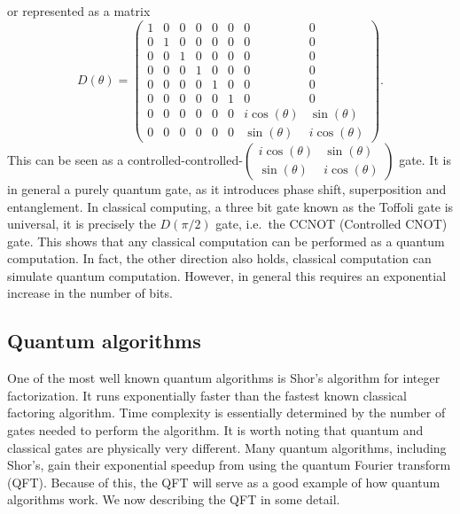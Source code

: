 \documentclass[a4paper,10pt,oneside]{book}
\theoremstyle{plain}
\theoremstyle{definition}
\theoremstyle{remark}
\begin{document}
or represented as a matrix
\begin{equation}
  D(\theta) =
  \begin{pmatrix}
    1 & 0 & 0 & 0 & 0 & 0 & 0 & 0 \\
    0 & 1 & 0 & 0 & 0 & 0 & 0 & 0 \\
    0 & 0 & 1 & 0 & 0 & 0 & 0 & 0 \\
    0 & 0 & 0 & 1 & 0 & 0 & 0 & 0 \\
    0 & 0 & 0 & 0 & 1 & 0 & 0 & 0 \\
    0 & 0 & 0 & 0 & 0 & 1 & 0 & 0 \\
    0 & 0 & 0 & 0 & 0 & 0 & i\cos(\theta) & \sin(\theta) \\
    0 & 0 & 0 & 0 & 0 & 0 & \sin(\theta) & i\cos(\theta)
  \end{pmatrix}.
\end{equation}
This can be seen as a controlled-controlled-$\begin{pmatrix}i\cos(\theta)&\sin(\theta)\\\sin(\theta)&i\cos(\theta)\end{pmatrix}$ gate. It is in general a purely quantum gate, as it introduces phase shift, superposition and entanglement. In classical computing, a three bit gate known as the Toffoli gate is universal, it is precisely the $D(\pi/2)$ gate, i.e.\ the CCNOT (Controlled CNOT) gate. This shows that any classical computation can be performed as a quantum computation. In fact, the other direction also holds, classical computation can simulate quantum computation. However, in general this requires an exponential increase in the number of bits.

\subsection{Quantum algorithms}

One of the most well known quantum algorithms is Shor's algorithm for integer factorization. It runs exponentially faster than the fastest known classical factoring algorithm. Time complexity is essentially determined by the number of gates needed to perform the algorithm. It is worth noting that quantum and classical gates are physically very different. Many quantum algorithms, including Shor's, gain their exponential speedup from using the quantum Fourier transform (QFT). Because of this, the QFT will serve as a good example of how quantum algorithms work. We now describing the QFT in some detail.
\end{document}
